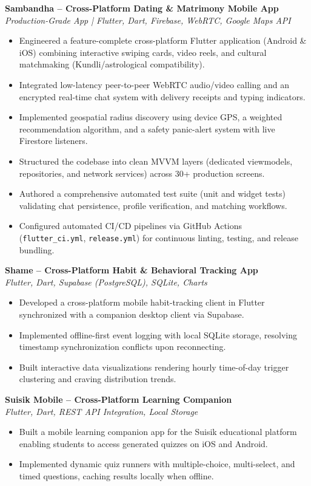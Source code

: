 \documentclass[a4paper,10pt]{article}
\begin{document}
\textbf{Sambandha -- Cross-Platform Dating \& Matrimony Mobile App} \\
\textit{Production-Grade App | Flutter, Dart, Firebase, WebRTC, Google Maps API}
\begin{itemize}
    \item Engineered a feature-complete cross-platform Flutter application (Android \& iOS) combining interactive swiping cards, video reels, and cultural matchmaking (Kundli/astrological compatibility).
    \item Integrated low-latency peer-to-peer WebRTC audio/video calling and an encrypted real-time chat system with delivery receipts and typing indicators.
    \item Implemented geospatial radius discovery using device GPS, a weighted recommendation algorithm, and a safety panic-alert system with live Firestore listeners.
    \item Structured the codebase into clean MVVM layers (dedicated viewmodels, repositories, and network services) across 30+ production screens.
    \item Authored a comprehensive automated test suite (unit and widget tests) validating chat persistence, profile verification, and matching workflows.
    \item Configured automated CI/CD pipelines via GitHub Actions (\texttt{flutter\_ci.yml}, \texttt{release.yml}) for continuous linting, testing, and release bundling.
\end{itemize}

\vspace{3pt}
\textbf{Shame -- Cross-Platform Habit \& Behavioral Tracking App} \\
\textit{Flutter, Dart, Supabase (PostgreSQL), SQLite, Charts}
\begin{itemize}
    \item Developed a cross-platform mobile habit-tracking client in Flutter synchronized with a companion desktop client via Supabase.
    \item Implemented offline-first event logging with local SQLite storage, resolving timestamp synchronization conflicts upon reconnecting.
    \item Built interactive data visualizations rendering hourly time-of-day trigger clustering and craving distribution trends.
\end{itemize}

\vspace{3pt}
\textbf{Suisik Mobile -- Cross-Platform Learning Companion} \\
\textit{Flutter, Dart, REST API Integration, Local Storage}
\begin{itemize}
    \item Built a mobile learning companion app for the Suisik educational platform enabling students to access generated quizzes on iOS and Android.
    \item Implemented dynamic quiz runners with multiple-choice, multi-select, and timed questions, caching results locally when offline.
\end{itemize}
\end{document}
